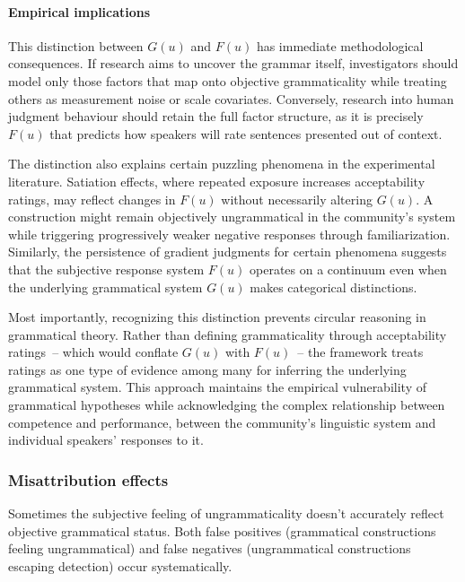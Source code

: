 \documentclass[12pt,letterpaper]{article}
\begin{document}
\paragraph{Empirical implications}

This distinction between $G(u)$ and $F(u)$ has immediate methodological consequences. If research aims to uncover the grammar itself, investigators should model only those factors that map onto objective grammaticality while treating others as measurement noise or scale covariates. Conversely, research into human judgment behaviour should retain the full factor structure, as it is precisely $F(u)$ that predicts how speakers will rate sentences presented out of context.

The distinction also explains certain puzzling phenomena in the experimental literature. Satiation effects, where repeated exposure increases acceptability ratings, may reflect changes in $F(u)$ without necessarily altering $G(u)$. A construction might remain objectively ungrammatical in the community's system while triggering progressively weaker negative responses through familiarization. Similarly, the persistence of gradient judgments for certain phenomena suggests that the subjective response system $F(u)$ operates on a continuum even when the underlying grammatical system $G(u)$ makes categorical distinctions.

Most importantly, recognizing this distinction prevents circular reasoning in grammatical theory. Rather than defining grammaticality through acceptability ratings~-- which would conflate $G(u)$ with $F(u)$~-- the framework treats ratings as one type of evidence among many for inferring the underlying grammatical system. This approach maintains the empirical vulnerability of grammatical hypotheses while acknowledging the complex relationship between competence and performance, between the community's linguistic system and individual speakers' responses to it.

\subsubsection{Misattribution effects}\label{sec:misattribution}

Sometimes the subjective feeling of ungrammaticality doesn't accurately reflect objective grammatical status. Both false positives (grammatical constructions feeling ungrammatical) and false negatives (ungrammatical constructions escaping detection) occur systematically.
\end{document}
